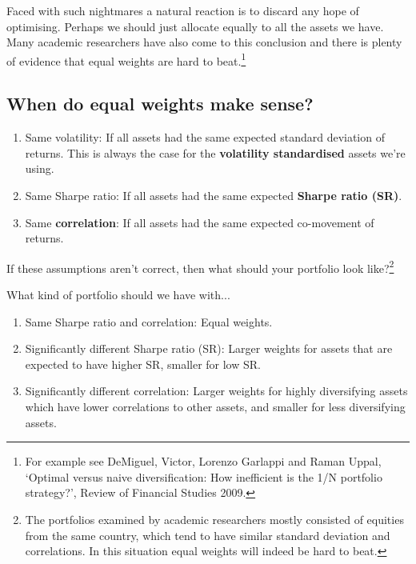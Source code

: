Faced with such nightmares a natural reaction is to discard any hope of optimising. Perhaps we should just allocate equally to all the assets we have. Many academic researchers have also come to this conclusion and there is plenty of evidence that equal weights are hard to beat.\footnote{For example see DeMiguel, Victor, Lorenzo Garlappi and Raman Uppal, ‘Optimal versus naive diversification: How inefficient is the 1/N portfolio strategy?', Review of Financial Studies 2009.}

\subsection*{When do equal weights make sense?\protect\footnotemark}

\begin{enumerate}
\item Same volatility: If all assets had the same expected standard deviation of returns. This is always the case for the \textbf{volatility standardised} assets we're using.
\item Same Sharpe ratio: If all assets had the same expected \textbf{Sharpe ratio (SR)}.
\item Same \textbf{correlation}: If all assets had the same expected co-movement of returns. 
\end{enumerate}

If these assumptions aren't correct, then what should your portfolio look like?\footnote{The portfolios examined by academic researchers mostly consisted of equities from the same country, which tend to have similar standard deviation and correlations. In this situation equal weights will indeed be hard to beat.} 

What kind of portfolio should we have with...

\begin{enumerate}
\item Same Sharpe ratio and correlation: Equal weights.
\item Significantly different Sharpe ratio (SR): Larger weights for assets that are expected to have higher SR, smaller for low SR.
\item Significantly different correlation: Larger weights for highly diversifying assets which have lower correlations to other assets, and smaller for less diversifying assets. \end{enumerate}

